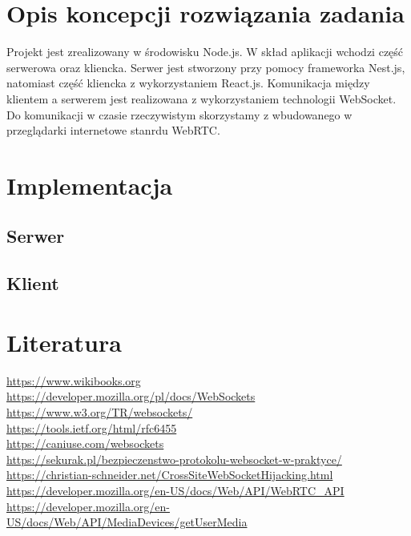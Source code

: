 \documentclass{article}
\begin{document}
\section{Opis koncepcji rozwiązania zadania}

Projekt jest zrealizowany w środowisku Node.js. W skład aplikacji wchodzi część serwerowa oraz kliencka. Serwer jest stworzony przy pomocy frameworka Nest.js, natomiast część kliencka z wykorzystaniem React.js. Komunikacja między klientem a serwerem jest realizowana z wykorzystaniem technologii WebSocket. Do komunikacji w czasie rzeczywistym skorzystamy z wbudowanego w przeglądarki internetowe stanrdu WebRTC.

\section{Implementacja}

\subsection{Serwer}

\subsection{Klient}

\section{Literatura}

\url{https://www.wikibooks.org}\\
\url{https://developer.mozilla.org/pl/docs/WebSockets}\\
\url{https://www.w3.org/TR/websockets/}\\
\url{https://tools.ietf.org/html/rfc6455}\\
\url{https://caniuse.com/websockets}\\
\url{https://sekurak.pl/bezpieczenstwo-protokolu-websocket-w-praktyce/}\\
\url{https://christian-schneider.net/CrossSiteWebSocketHijacking.html}\\
\url{https://developer.mozilla.org/en-US/docs/Web/API/WebRTC_API}\\
\url{https://developer.mozilla.org/en-US/docs/Web/API/MediaDevices/getUserMedia}
\end{document}
